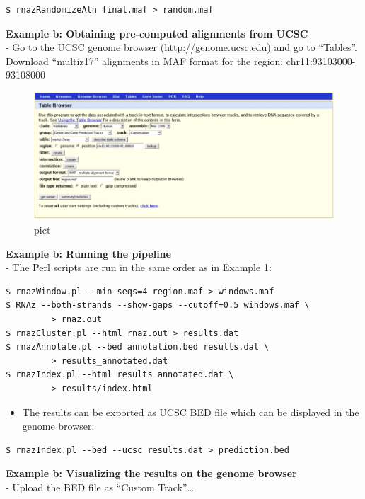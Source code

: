 \documentclass[]{article}
\providecommand{\tightlist}{%
  \setlength{\itemsep}{0pt}\setlength{\parskip}{0pt}}
\begin{document}
\begin{verbatim}
$ rnazRandomizeAln final.maf > random.maf
\end{verbatim}

\textbf{Example b: Obtaining pre-computed alignments from UCSC}\\
- Go to the UCSC genome browser
(\href{http://genome.ucsc.edu/}{http://genome.ucsc.edu}) and go to
``Tables''. Download ``multiz17'' alignments in MAF format for the
region: chr11:93103000-93108000

\begin{figure}[htbp]
\centering
\includegraphics{Figs/table-browser.png}
\caption{pict}
\end{figure}

\textbf{Example b: Running the pipeline}\\
- The Perl scripts are run in the same order as in Example 1:

\begin{verbatim}
$ rnazWindow.pl --min-seqs=4 region.maf > windows.maf
$ RNAz --both-strands --show-gaps --cutoff=0.5 windows.maf \
         > rnaz.out
$ rnazCluster.pl --html rnaz.out > results.dat
$ rnazAnnotate.pl --bed annotation.bed results.dat \
         > results_annotated.dat
$ rnazIndex.pl --html results_annotated.dat \
         > results/index.html
\end{verbatim}

\begin{itemize}
\tightlist
\item
  The results can be exported as UCSC BED file which can be displayed in
  the genome browser:
\end{itemize}

\begin{verbatim}
$ rnazIndex.pl --bed --ucsc results.dat > prediction.bed
\end{verbatim}

\textbf{Example b: Visualizing the results on the genome browser}\\
- Upload the BED file as ``Custom Track''\ldots{}
\end{document}

